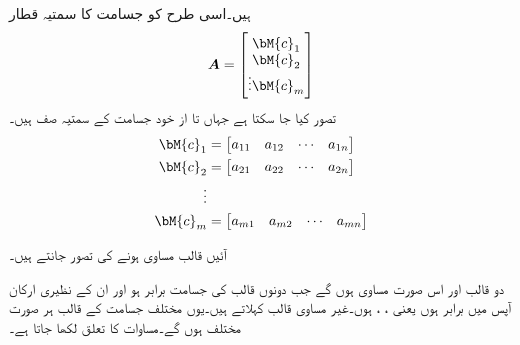 ہیں۔اسی طرح  کو  جسامت کا سمتیہ قطار
\begin{align}
\bm{A}=\begin{bmatrix} \bM{c}_1 \\ \bM{c}_2 \\ \vdots \bM{c}_m \end{bmatrix}
\end{align}
تصور کیا جا سکتا ہے جہاں  تا  از خود  جسامت کے سمتیہ صف ہیں۔
\begin{gather}
\begin{aligned}
\bM{c}_1&=\begin{bmatrix} a_{11}& a_{12} & \cdots &a_{1n} \end{bmatrix}\\
\bM{c}_2&=\begin{bmatrix} a_{21}& a_{22} & \cdots &a_{2n} \end{bmatrix}\\
\vdots\\
\bM{c}_m&=\begin{bmatrix} a_{m1}& a_{m2} & \cdots &a_{mn} \end{bmatrix}
\end{aligned}
\end{gather}

آئیں قالب مساوی ہونے کی تصور جانتے ہیں۔

دو قالب  اور  اس صورت مساوی ہوں گے جب دونوں قالب کی جسامت برابر ہو اور ان کے نظیری ارکان آپس میں برابر ہوں یعنی 
، ،  ہوں۔غیر مساوی قالب  کہلاتے ہیں۔یوں مختلف جسامت کے قالب ہر صورت مختلف ہوں گے۔مساوات کا تعلق  لکھا جاتا ہے۔


